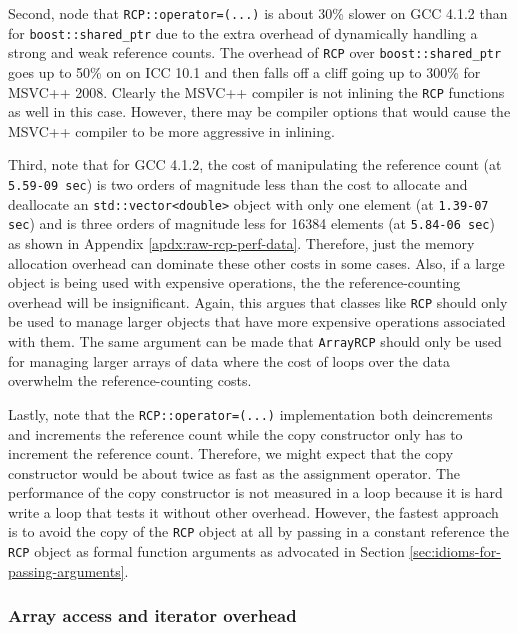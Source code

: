 \documentclass[pdf,ps2pdf,11pt]{SANDreport}
\begin{document}
Second, node that {}\texttt{RCP::operator=(...)} is about 30\% slower
on GCC 4.1.2 than for {}\texttt{boost::shared\_ptr} due to the extra
overhead of dynamically handling a strong and weak reference counts.
The overhead of {}\texttt{RCP} over {}\texttt{boost::shared\_ptr} goes
up to 50\% on on ICC 10.1 and then falls off a cliff going up to 300\%
for MSVC++ 2008.  Clearly the MSVC++ compiler is not inlining the
{}\texttt{RCP} functions as well in this case.  However, there may be
compiler options that would cause the MSVC++ compiler to be more
aggressive in inlining.

Third, note that for GCC 4.1.2, the cost of manipulating the reference
count (at {}\texttt{5.59-09 sec}) is two orders of magnitude less than
the cost to allocate and deallocate an {}\texttt{std::vector<double>}
object with only one element (at {}\texttt{1.39-07 sec}) and is three
orders of magnitude less for 16384 elements (at {}\texttt{5.84-06
sec}) as shown in Appendix {}\ref{apdx:raw-rcp-perf-data}.  Therefore,
just the memory allocation overhead can dominate these other costs in
some cases.  Also, if a large object is being used with expensive
operations, the the reference-counting overhead will be insignificant.
Again, this argues that classes like {}\texttt{RCP} should only be
used to manage larger objects that have more expensive operations
associated with them.  The same argument can be made that
{}\texttt{ArrayRCP} should only be used for managing larger arrays of
data where the cost of loops over the data overwhelm the
reference-counting costs.

Lastly, note that the {}\texttt{RCP::operator=(...)} implementation
both deincrements and increments the reference count while the copy
constructor only has to increment the reference count.  Therefore, we
might expect that the copy constructor would be about twice as fast as
the assignment operator.  The performance of the copy constructor is
not measured in a loop because it is hard write a loop that tests it
without other overhead.  However, the fastest approach is to avoid the
copy of the {}\texttt{RCP} object at all by passing in a constant
reference the {}\texttt{RCP} object as formal function arguments as
advocated in Section {}\ref{sec:idioms-for-passing-arguments}.


%
{}\subsubsection{Array access and iterator overhead}
\label{sec:array-overhead}
%
\end{document}
